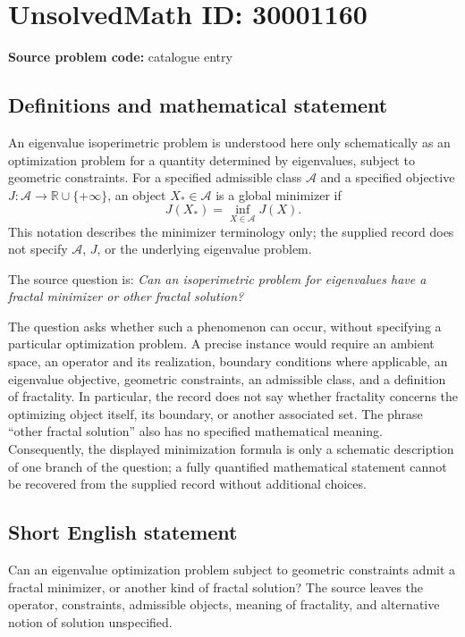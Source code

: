 \documentclass[11pt]{article}
\newcommand{\R}{\mathbb{R}}
\begin{document}
\section*{UnsolvedMath ID: 30001160}
\textbf{Source problem code:} catalogue entry
\subsection{Definitions and mathematical statement}
An eigenvalue isoperimetric problem is understood here only schematically as an optimization problem for a quantity determined by eigenvalues, subject to geometric constraints. For a specified admissible class \(\mathcal A\) and a specified objective \(J\colon\mathcal A\to\R\cup\{+\infty\}\), an object \(X_*\in\mathcal A\) is a global minimizer if
\[
J(X_*)=\inf_{X\in\mathcal A}J(X).
\]
This notation describes the minimizer terminology only; the supplied record does not specify \(\mathcal A\), \(J\), or the underlying eigenvalue problem.

The source question is: \emph{Can an isoperimetric problem for eigenvalues have a fractal minimizer or other fractal solution?}

The question asks whether such a phenomenon can occur, without specifying a particular optimization problem. A precise instance would require an ambient space, an operator and its realization, boundary conditions where applicable, an eigenvalue objective, geometric constraints, an admissible class, and a definition of fractality. In particular, the record does not say whether fractality concerns the optimizing object itself, its boundary, or another associated set. The phrase ``other fractal solution'' also has no specified mathematical meaning. Consequently, the displayed minimization formula is only a schematic description of one branch of the question; a fully quantified mathematical statement cannot be recovered from the supplied record without additional choices.
\subsection{Short English statement}
Can an eigenvalue optimization problem subject to geometric constraints admit a fractal minimizer, or another kind of fractal solution? The source leaves the operator, constraints, admissible objects, meaning of fractality, and alternative notion of solution unspecified.
\end{document}
